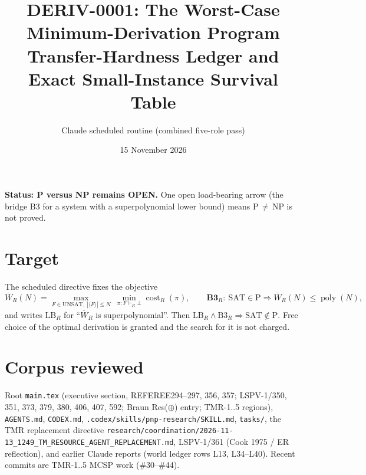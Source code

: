 \documentclass[11pt]{article}
\title{DERIV-0001: The Worst-Case Minimum-Derivation Program\\
Transfer-Hardness Ledger and Exact Small-Instance Survival Table}
\author{Claude scheduled routine (combined five-role pass)}
\date{15 November 2026}
\begin{document}
\maketitle

\noindent\textbf{Status: P versus NP remains OPEN.} One open load-bearing arrow
(the bridge B3 for a system with a superpolynomial lower bound) means
P\,$\ne$\,NP is not proved.

\section{Target}
The scheduled directive fixes the objective
\[
\overline W_R(N)=\max_{F\in\mathrm{UNSAT},\ |\langle F\rangle|\le N}\ \min_{\pi:F\vdash_R\bot}\operatorname{cost}_R(\pi),
\qquad
\textbf{B3}_R:\ \mathrm{SAT}\in\mathrm P\Longrightarrow \overline W_R(N)\le\operatorname{poly}(N),
\]
and writes $\mathrm{LB}_R$ for ``$\overline W_R$ is superpolynomial''. Then
$\mathrm{LB}_R\wedge\mathrm{B3}_R\Rightarrow\mathrm{SAT}\notin\mathrm P$.
Free choice of the optimal derivation is granted and the search for it is not charged.

\section{Corpus reviewed}
Root \texttt{main.tex} (executive section, REFEREE294--297, 356, 357; LSPV-1/350, 351,
373, 379, 380, 406, 407, 592; Braun Res($\oplus$) entry; TMR-1..5 regions),
\texttt{AGENTS.md}, \texttt{CODEX.md}, \texttt{.codex/skills/pnp-research/SKILL.md},
\texttt{tasks/}, the TMR replacement directive
\texttt{research/coordination/2026-11-13\_1249\_TM\_RESOURCE\_AGENT\_REPLACEMENT.md},
LSPV-1/361 (Cook 1975 / ER reflection), and earlier Claude reports
(world ledger rows L13, L34--L40). Recent commits are TMR-1..5 MCSP work (\#30--\#44).
\end{document}
